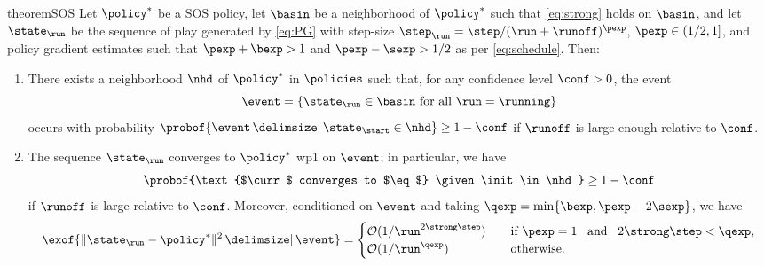 \begin{restatable}{theorem}{SOS}
\label{thm:SOS}
Let $\eq$ be a \acl{SOS} policy,
let $\basin$ be a neighborhood of $\eq$ such that \eqref{eq:strong} holds on $\basin$,
and
let $\curr$ be the sequence of play generated by \eqref{eq:PG} with step-size $\curr[\step] = \step/(\run + \runoff)^{\pexp}$, $\pexp \in (1/2,1]$, and policy gradient estimates such that $\pexp + \bexp > 1$ and $\pexp - \sexp > 1/2$ as per \eqref{eq:schedule}.
Then:
\begin{enumerate}
\item
There exists a neighborhood $\nhd$ of $\eq$ in $\policies$ such that, for any confidence level $\conf>0$, the event
\begin{equation}
\label{eq:good}
\event
	= \braces{\text{$\curr \in \basin$ for all $\run=\running$}}
\end{equation}
occurs with probability
\(
\probof{\event \given \init\in\nhd} \geq 1-\conf
\)
if $\runoff$ is large enough relative to $\conf$.
\item
The sequence $\curr$ converges to $\eq$ \acl{wp1} on $\event$;
in particular, we have
\begin{equation}
\label{eq:prob-converge}
\probof{\text{$\curr$ converges to $\eq$} \given \init\in\nhd}
	\geq 1-\conf
\end{equation}
if $\runoff$ is large relative to $\conf$.
Moreover, conditioned on $\event$ and taking $\qexp = \min\{\bexp,\pexp - 2\sexp\}$, we have
\begin{equation}
\label{eq:conv-rate}
\exof{\norm{\curr - \eq}^{2} \given \event}
	=
	\begin{cases}
	\bigoh(1/\run^{2\strong\step})
		&\quad
		\text{if $\pexp=1$ \, and \, $2\strong\step<\qexp$},
		\\
	\bigoh(1/\run^{\qexp})
		&\quad
		\text{otherwise}.
	\end{cases}
\end{equation}
\end{enumerate}
\end{restatable}

